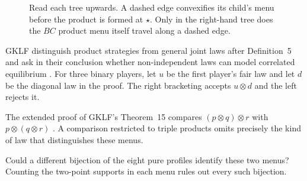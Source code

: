 \documentclass[11pt,a4paper]{article}
\theoremstyle{definition}
\newcommand{\D}{\mathcal D}
\begin{document}
\begin{figure}[!htbp]
    \centering\small
    \caption{Read each tree upwards. A dashed edge convexifies its child's menu before the product is formed at $\star$. Only in the right-hand tree does the $BC$ product menu itself travel along a dashed edge.}\label{fig:brackets}
\end{figure}

GKLF distinguish product strategies from general joint laws after Definition~5 and ask in their conclusion whether non-independent laws can model correlated equilibrium \cite[pp.~98 and~104]{gklf}. For three binary players, let $u$ be the first player's fair law and let $d$ be the diagonal law in the proof. The right bracketing accepts $u\otimes d$ and the left rejects it.

The extended proof of GKLF's Theorem~15 compares $(p\otimes q)\otimes r$ with $p\otimes(q\otimes r)$ \cite[Appendix, pp.~14--15]{extended}. A comparison restricted to triple products omits precisely the kind of law that distinguishes these menus.

Could a different bijection of the eight pure profiles identify these two menus? Counting the two-point supports in each menu rules out every such bijection.
\end{document}
